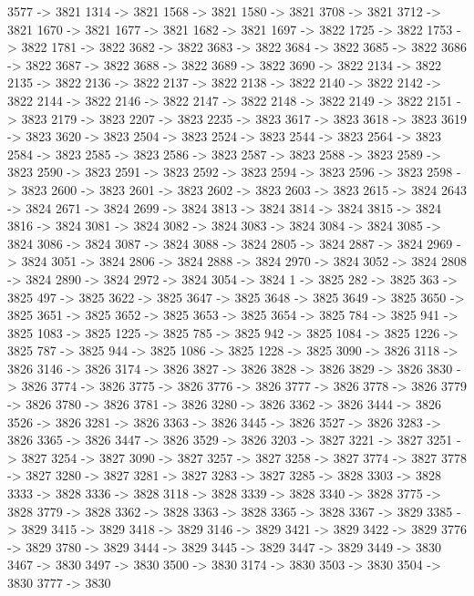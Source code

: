 {	3577 -> 3821
	1314 -> 3821
	1568 -> 3821
	1580 -> 3821
	3708 -> 3821
	3712 -> 3821
	1670 -> 3821
	1677 -> 3821
	1682 -> 3821
	1697 -> 3822
	1725 -> 3822
	1753 -> 3822
	1781 -> 3822
	3682 -> 3822
	3683 -> 3822
	3684 -> 3822
	3685 -> 3822
	3686 -> 3822
	3687 -> 3822
	3688 -> 3822
	3689 -> 3822
	3690 -> 3822
	2134 -> 3822
	2135 -> 3822
	2136 -> 3822
	2137 -> 3822
	2138 -> 3822
	2140 -> 3822
	2142 -> 3822
	2144 -> 3822
	2146 -> 3822
	2147 -> 3822
	2148 -> 3822
	2149 -> 3822
	2151 -> 3823
	2179 -> 3823
	2207 -> 3823
	2235 -> 3823
	3617 -> 3823
	3618 -> 3823
	3619 -> 3823
	3620 -> 3823
	2504 -> 3823
	2524 -> 3823
	2544 -> 3823
	2564 -> 3823
	2584 -> 3823
	2585 -> 3823
	2586 -> 3823
	2587 -> 3823
	2588 -> 3823
	2589 -> 3823
	2590 -> 3823
	2591 -> 3823
	2592 -> 3823
	2594 -> 3823
	2596 -> 3823
	2598 -> 3823
	2600 -> 3823
	2601 -> 3823
	2602 -> 3823
	2603 -> 3823
	2615 -> 3824
	2643 -> 3824
	2671 -> 3824
	2699 -> 3824
	3813 -> 3824
	3814 -> 3824
	3815 -> 3824
	3816 -> 3824
	3081 -> 3824
	3082 -> 3824
	3083 -> 3824
	3084 -> 3824
	3085 -> 3824
	3086 -> 3824
	3087 -> 3824
	3088 -> 3824
	2805 -> 3824
	2887 -> 3824
	2969 -> 3824
	3051 -> 3824
	2806 -> 3824
	2888 -> 3824
	2970 -> 3824
	3052 -> 3824
	2808 -> 3824
	2890 -> 3824
	2972 -> 3824
	3054 -> 3824
	1 -> 3825
	282 -> 3825
	363 -> 3825
	497 -> 3825
	3622 -> 3825
	3647 -> 3825
	3648 -> 3825
	3649 -> 3825
	3650 -> 3825
	3651 -> 3825
	3652 -> 3825
	3653 -> 3825
	3654 -> 3825
	784 -> 3825
	941 -> 3825
	1083 -> 3825
	1225 -> 3825
	785 -> 3825
	942 -> 3825
	1084 -> 3825
	1226 -> 3825
	787 -> 3825
	944 -> 3825
	1086 -> 3825
	1228 -> 3825
	3090 -> 3826
	3118 -> 3826
	3146 -> 3826
	3174 -> 3826
	3827 -> 3826
	3828 -> 3826
	3829 -> 3826
	3830 -> 3826
	3774 -> 3826
	3775 -> 3826
	3776 -> 3826
	3777 -> 3826
	3778 -> 3826
	3779 -> 3826
	3780 -> 3826
	3781 -> 3826
	3280 -> 3826
	3362 -> 3826
	3444 -> 3826
	3526 -> 3826
	3281 -> 3826
	3363 -> 3826
	3445 -> 3826
	3527 -> 3826
	3283 -> 3826
	3365 -> 3826
	3447 -> 3826
	3529 -> 3826
	3203 -> 3827
	3221 -> 3827
	3251 -> 3827
	3254 -> 3827
	3090 -> 3827
	3257 -> 3827
	3258 -> 3827
	3774 -> 3827
	3778 -> 3827
	3280 -> 3827
	3281 -> 3827
	3283 -> 3827
	3285 -> 3828
	3303 -> 3828
	3333 -> 3828
	3336 -> 3828
	3118 -> 3828
	3339 -> 3828
	3340 -> 3828
	3775 -> 3828
	3779 -> 3828
	3362 -> 3828
	3363 -> 3828
	3365 -> 3828
	3367 -> 3829
	3385 -> 3829
	3415 -> 3829
	3418 -> 3829
	3146 -> 3829
	3421 -> 3829
	3422 -> 3829
	3776 -> 3829
	3780 -> 3829
	3444 -> 3829
	3445 -> 3829
	3447 -> 3829
	3449 -> 3830
	3467 -> 3830
	3497 -> 3830
	3500 -> 3830
	3174 -> 3830
	3503 -> 3830
	3504 -> 3830
	3777 -> 3830
}
